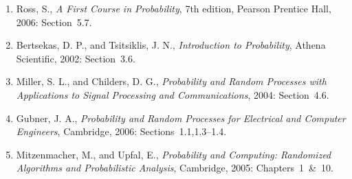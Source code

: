 \begin{small}
\begin{enumerate}
\item Ross, S., \emph{A First Course in Probability}, 7th edition, Pearson Prentice Hall, 2006: Section~5.7.
\item Bertsekas, D. P., and Tsitsiklis, J. N., \emph{Introduction to Probability}, Athena Scientific, 2002: Section~3.6.
\item Miller, S. L., and Childers, D. G., \emph{Probability and Random Processes with Applications to Signal Processing and Communications}, 2004: Section~4.6.
\item Gubner, J. A., \emph{Probability and Random Processes for Electrical and Computer Engineers}, Cambridge, 2006: Sections~1.1,1.3--1.4.

\item Mitzenmacher, M., and Upfal, E., \emph{Probability and Computing: Randomized Algorithms and Probabilistic Analysis}, Cambridge, 2005: Chapters~1~\&~10.
\end{enumerate}
\end{small}

